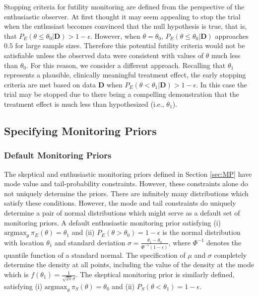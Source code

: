 \documentclass[12pt]{article}
\begin{document}
Stopping criteria for futility monitoring are defined from the perspective of the enthusiastic observer. At first thought it may seem appealing to stop the trial when the enthusiast becomes convinced that the
null hypothesis is true, that is, that $P_E(\theta\leq\theta_0|\mathbf{D})>1-\epsilon$. 
%
However, when $\theta=\theta_0$, $P_E(\theta\le\theta_0| \mathbf{D})$ approaches $0.5$ for large sample sizes. 
%
Therefore this potential futility criteria would not be satisfiable unless the observed data were consistent with values of
$\theta$ much less than $\theta_0$.
%
For this reason, we consider a different approach.
%
Recalling that $\theta_1$ represents a plausible, clinically meaningful treatment effect, the early stopping criteria are met based on data $\mathbf{D}$ when $P_E\left(\theta<\theta_1| \mathbf{D}\right)>1-\epsilon$. In this case the trial may be stopped due to there being a compelling demonstration that the treatment effect is much less than hypothesized (i.e., $\theta_1$).
%
\subsection{Specifying Monitoring Priors}\label{sec:mps}
\subsubsection{Default Monitoring Priors}\label{sec:def-mon-priors}
The skeptical and enthusiastic monitoring priors defined in Section \ref{sec:MP} have mode value and tail-probability constraints. 
%
However, these constraints alone do not uniquely determine the priors.
%
There are infinitely many distributions which satisfy these conditions.
%
However, the mode and tail constraints do uniquely determine a pair of normal distributions which might serve as a default set of monitoring priors. 
%
%
A default enthusiastic monitoring prior satisfying (i) $\text{argmax}_\theta~\pi_E(\theta)=\theta_1$
and (ii) $P_E(\theta > \theta_0)=1-\epsilon$ is the normal distribution with location $\theta_1$ and standard deviation $\sigma=\frac{\theta_1-\theta_0}{\Phi^{-1}(1-\epsilon)}$, where $\Phi^{-1}$ denotes the quantile function of a standard normal.
%
The specification of $\mu$ and $\sigma$ completely determine the density at all points, including the value of the density at the mode which is $f(\theta_1)=\frac{1}{\sqrt{2\pi}\sigma}$.
%
The skeptical monitoring prior is similarly defined, satisfying (i) $\text{argmax}_\theta~\pi_S(\theta)=\theta_0$ and (ii) $P_S(\theta < \theta_1)=1-\epsilon$.
\end{document}
